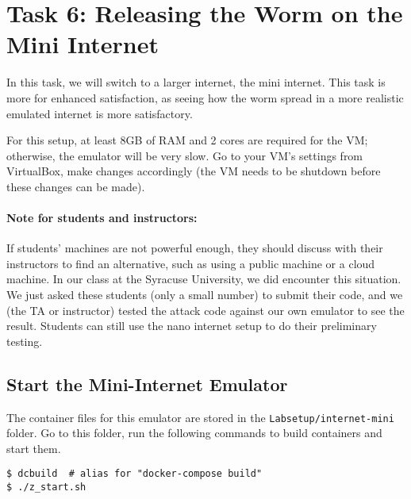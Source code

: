\section{Task 6: Releasing the Worm on the Mini Internet} 

In this task, we will switch to a larger internet, the mini internet. 
This task is more for enhanced satisfaction, as seeing
how the worm spread in a more realistic emulated internet is more 
satisfactory. 

For this setup, at least 8GB of RAM and 2 cores are required 
for the VM; otherwise, the emulator will be very slow. Go to your VM's settings
from VirtualBox, make changes accordingly (the VM needs to be shutdown
before these changes can be made).

\paragraph{Note for students and instructors:} 
If students' machines are not powerful enough, 
they should discuss with their instructors to 
find an alternative, such as using a public machine 
or a cloud machine. In our class at the Syracuse University, 
we did encounter this situation. We just asked these students (only a small number)
to submit their code, and we (the TA or instructor) tested the attack 
code against our own emulator to see the result. Students can 
still use the nano internet setup to do their preliminary testing. 




\subsection{Start the Mini-Internet Emulator} 

The container files for this emulator are stored 
in the \texttt{Labsetup/internet-mini} folder. Go to this folder,
run the following commands to build containers and start them.


\begin{lstlisting}
$ dcbuild  # alias for "docker-compose build" 
$ ./z_start.sh
\end{lstlisting}
 

